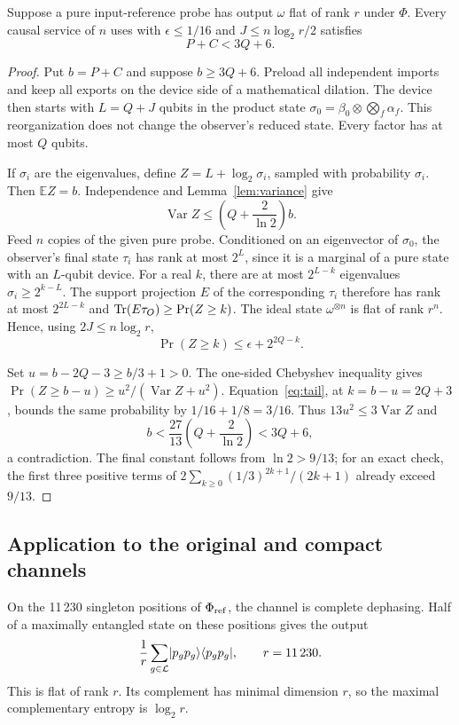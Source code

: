 \begin{proposition}\label{prop:budget}
Suppose a pure input-reference probe has output $\omega$ flat of rank $r$ under $\Phi$.
Every causal service of $n$ uses with $\epsilon\le1/16$ and $J\le n\log_2r/2$ satisfies
\begin{equation}
 P+C<3Q+6.\label{eq:budget}
\end{equation}
\end{proposition}
\begin{proof}
Put $b=P+C$ and suppose $b\ge3Q+6$. Preload all independent imports and keep all exports
on the device side of a mathematical dilation. The device then starts with $L=Q+J$ qubits
in the product state $\sigma_0=\beta_0\otimes\bigotimes_f\alpha_f$. This reorganization
does not change the observer's reduced state. Every factor has at most $Q$ qubits.

If $\sigma_i$ are the eigenvalues, define $Z=L+\log_2\sigma_i$, sampled with probability
$\sigma_i$. Then $\mathbb EZ=b$. Independence and Lemma~\ref{lem:variance} give
\[
 \operatorname{Var}Z\le\left(Q+\frac2{\ln2}\right)b.
\]
Feed $n$ copies of the given pure probe. Conditioned on an eigenvector of $\sigma_0$, the
observer's final state $\tau_i$ has rank at most $2^L$, since it is a marginal of a pure
state with an $L$-qubit device. For a real $k$, there are at most $2^{L-k}$ eigenvalues
$\sigma_i\ge2^{k-L}$. The support projection $E$ of the corresponding $\tau_i$ therefore
has rank at most $2^{2L-k}$ and
$\operatorname{Tr}(E\tau_O)\ge\Pr(Z\ge k)$. The ideal state $\omega^{\otimes n}$ is flat of rank
$r^n$. Hence, using $2J\le n\log_2r$,
\begin{equation}
 \Pr(Z\ge k)\le\epsilon+2^{2Q-k}.\label{eq:tail}
\end{equation}

Set $u=b-2Q-3\ge b/3+1>0$. The one-sided Chebyshev inequality gives
$\Pr(Z\ge b-u)\ge u^2/(\operatorname{Var}Z+u^2)$. Equation~\eqref{eq:tail}, at
$k=b-u=2Q+3$, bounds the same probability by $1/16+1/8=3/16$.
Thus $13u^2\le3\operatorname{Var}Z$ and
\[
 b<\frac{27}{13}\left(Q+\frac2{\ln2}\right)<3Q+6,
\]
a contradiction. The final constant follows from $\ln2>9/13$; for an exact check, the first
three positive terms of $2\sum_{k\ge0}(1/3)^{2k+1}/(2k+1)$ already exceed $9/13$.
\end{proof}

\subsection{Application to the original and compact channels}
On the 11\,230 singleton positions of $\Phi_{\mathrm{ref}}$, the channel is complete dephasing.
Half of a maximally entangled state on these positions gives the output
\[
 \frac1r\sum_{g\in\mathcal L}\lvert p_gp_g\rangle\langle p_gp_g\rvert,\qquad r=11\,230.
\]
This is flat of rank $r$. Its complement has minimal dimension $r$, so the maximal
complementary entropy is $\log_2r$.

